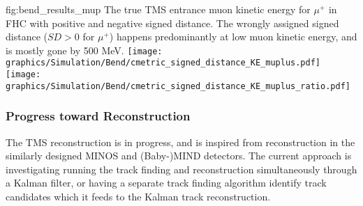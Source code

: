 \begin{dunefigure}[]{fig:bend_results_mup}
{The true TMS entrance muon kinetic energy for $\mu^+$ in FHC with positive and negative signed distance. The wrongly assigned signed distance ($SD>0$ for $\mu^+$) happens predominantly at low muon kinetic energy, and is mostly gone by 500 MeV.}
\texttt{[image: graphics/Simulation/Bend/cmetric\_signed\_distance\_KE\_muplus.pdf]} \texttt{[image: graphics/Simulation/Bend/cmetric\_signed\_distance\_KE\_muplus\_ratio.pdf]}
\end{dunefigure}

\iffalse
\begin{dunetable}
[]
{cccc}
{tab:muon_bend}
{Fraction of events with their calculated signed distance for $\mu^{\pm}$ in the TMS, including the effects of cuts on the true kinetic energy in the TMS.}
Particle & Signed Distance & $T^{TMS}_\mu$ & Fraction \\ \toprowrule
$\mu^-$ & $SD>0$ & & 95.4\% \\ \colhline
$\mu^-$ & $SD<0$ & & 4.6\% \\ \colhline
$\mu^-$ & $SD>0$ & $> 0.5 \text{ GeV}$ & 98.0\% \\ \colhline
$\mu^-$ & $SD<0$ & $> 0.5 \text{ GeV}$ & 2.0\% \\ \colhline
$\mu^-$ & $SD>0$ & $= 1.0 \text{ GeV}$ & 99.1\% \\ \colhline
$\mu^-$ & $SD<0$ & $= 1.0 \text{ GeV}$ & 0.9\% \\ \colhline
$\mu^+$ & $SD>0$ & & 4.0\% \\ \colhline
$\mu^+$ & $SD<0$ & & 96.0\% \\ %
\end{dunetable}
\fi


\label{sec:tms-ovvw-perf}
\subsubsection{Progress toward Reconstruction}
\label{sec:tms-ovvw-perf}
The TMS reconstruction is in progress, and is inspired from reconstruction in the similarly designed MINOS and (Baby-)MIND detectors. The current approach is investigating running the track finding and reconstruction simultaneously through a Kalman filter, or having a separate track finding algorithm identify track candidates which it feeds to the Kalman track reconstruction.

